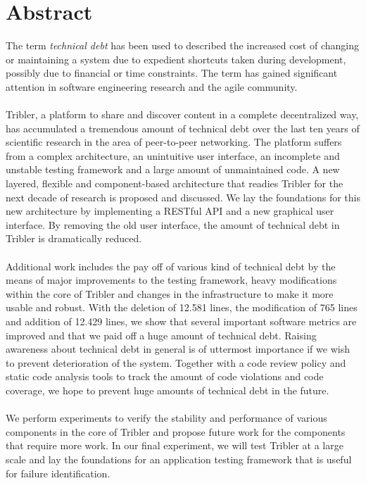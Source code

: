 \chapter*{Abstract}
The term \emph{technical debt} has been used to described the increased cost of changing or maintaining a system due to expedient shortcuts taken during development, possibly due to financial or time constraints. The term has gained significant attention in software engineering research and the agile community.\\\\
Tribler, a platform to share and discover content in a complete decentralized way, has accumulated a tremendous amount of technical debt over the last ten years of scientific research in the area of peer-to-peer networking.
The platform suffers from a complex architecture, an unintuitive user interface, an incomplete and unstable testing framework and a large amount of unmaintained code.
A new layered, flexible and component-based architecture that readies Tribler for the next decade of research is proposed and discussed.
We lay the foundations for this new architecture by implementing a RESTful API and a new graphical user interface. By removing the old user interface, the amount of technical debt in Tribler is dramatically reduced.\\\\
Additional work includes the pay off of various kind of technical debt by the means of major improvements to the testing framework, heavy modifications within the core of Tribler and changes in the infrastructure to make it more usable and robust.
With the deletion of 12.581 lines, the modification of 765 lines and addition of 12.429 lines, we show that several important software metrics are improved and that we paid off a huge amount of technical debt. 
Raising awareness about technical debt in general is of uttermost importance if we wish to prevent deterioration of the system.
Together with a code review policy and static code analysis tools to track the amount of code violations and code coverage, we hope to prevent huge amounts of technical debt in the future.\\\\
We perform experiments to verify the stability and performance of various components in the core of Tribler and propose future work for the components that require more work. In our final experiment, we will test Tribler at a large scale and lay the foundations for an application testing framework that is useful for failure identification.